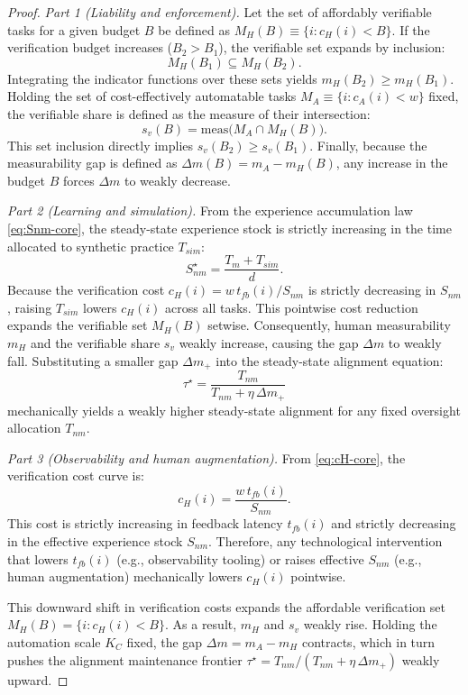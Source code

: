 \documentclass[12pt, letter]{article}
\begin{document}
\begin{proof}
\textit{Part 1 (Liability and enforcement).} Let the set of affordably verifiable tasks for a given budget $B$ be defined as $M_H(B)\equiv\{i:c_H(i)<B\}$. If the verification budget increases ($B_2>B_1$), the verifiable set expands by inclusion:
\[
    M_H(B_1) \subseteq M_H(B_2).
\]
Integrating the indicator functions over these sets yields $m_H(B_2)\ge m_H(B_1)$. Holding the set of cost-effectively automatable tasks $M_A\equiv\{i:c_A(i)<w\}$ fixed, the verifiable share is defined as the measure of their intersection:
\[
    s_v(B) = \text{meas}\big(M_A\cap M_H(B)\big).
\]
This set inclusion directly implies $s_v(B_2)\ge s_v(B_1)$. Finally, because the measurability gap is defined as $\Delta m(B)=m_A-m_H(B)$, any increase in the budget $B$ forces $\Delta m$ to weakly decrease.

\textit{Part 2 (Learning and simulation).} From the experience accumulation law \eqref{eq:Snm-core}, the steady-state experience stock is strictly increasing in the time allocated to synthetic practice $T_{sim}$:
\[
    S^\star_{nm} = \frac{T_m+T_{sim}}{d}.
\]
Because the verification cost $c_H(i)=w\,t_{fb}(i)/S_{nm}$ is strictly decreasing in $S_{nm}$, raising $T_{sim}$ lowers $c_H(i)$ across all tasks. This pointwise cost reduction expands the verifiable set $M_H(B)$ setwise. Consequently, human measurability $m_H$ and the verifiable share $s_v$ weakly increase, causing the gap $\Delta m$ to weakly fall. Substituting a smaller gap $\Delta m_+$ into the steady-state alignment equation:
\[
    \tau^\star = \frac{T_{nm}}{T_{nm}+\eta\,\Delta m_+}
\]
mechanically yields a weakly higher steady-state alignment for any fixed oversight allocation $T_{nm}$.

\textit{Part 3 (Observability and human augmentation).} From \eqref{eq:cH-core}, the verification cost curve is:
\[
    c_H(i) = \frac{w\,t_{fb}(i)}{S_{nm}}.
\]
This cost is strictly increasing in feedback latency $t_{fb}(i)$ and strictly decreasing in the effective experience stock $S_{nm}$. Therefore, any technological intervention that lowers $t_{fb}(i)$ (e.g., observability tooling) or raises effective $S_{nm}$ (e.g., human augmentation) mechanically lowers $c_H(i)$ pointwise. 

This downward shift in verification costs expands the affordable verification set $M_H(B)=\{i:c_H(i)<B\}$. As a result, $m_H$ and $s_v$ weakly rise. Holding the automation scale $K_C$ fixed, the gap $\Delta m=m_A-m_H$ contracts, which in turn pushes the alignment maintenance frontier $\tau^\star=T_{nm}/(T_{nm}+\eta\,\Delta m_+)$ weakly upward.
\end{proof}
\end{document}
